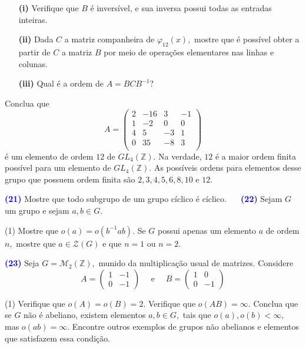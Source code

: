 \documentclass[12pt, a4paper]{article}
\newcommand{\negrito}[1]{\mbox{\boldmath{$#1$}}}
\begin{document}
\begin{tasks}[counter-format={(tsk[a])},label-width=3.6ex, label-format = {\bfseries}, column-sep = {0pt}]
\begin{itemize}
\item[\textbf{(i)}] Verifique que $B$ é inversível, e sua inversa possui todas as entradas inteiras.
\item[\textbf{(ii)}] Dada $C$ a matriz companheira de $\varphi_{12}(x),$ mostre que é possível obter a partir de $C$ a matriz $B$ por meio de operações elementares nas linhas e colunas.
\item[\textbf{(iii)}] Qual é a ordem de $A = BCB^{-1}?$
\end{itemize}
\task[\textcolor{Floresta}{$\negrito{(d)} $}] Conclua que 
\[
A =  \left(\begin{array}{cccc}
2 & -16 & 3 & -1\\
1 & -2 & 0 & 0\\
4 & 5 & -3 & 1\\
0 & 35 & -8 & 3\\
\end{array}\right)
\]
é um elemento de ordem $12$ de $GL_4(\mathbb{Z})$. Na verdade, $12$ é a maior ordem finita possível para um elemento de $GL_4(\mathbb{Z}).$ As possíveis ordens para elementos desse grupo que possuem ordem finita são $2,3,4,5,6,8,10$ e $12.$
\end{tasks}
\textcolor{blue}{\bf(21)}\label{28} Mostre que todo subgrupo de um grupo cíclico é cíclico.
\textcolor{white}{Oi}\newline\newline
\textcolor{blue}{\bf(22)}\label{29} Sejam $G$ um grupo e sejam $a,b \in G.$
\begin{tasks}[counter-format={(tsk[a])},label-width=3.6ex, label-format = {\bfseries}, column-sep = {0pt}](1)
\task[\textcolor{Floresta}{$\negrito{(a)} $}] Mostre que $o(a) = o(b^{-1}ab).$
\task[\textcolor{Floresta}{$\negrito{(b)} $}] Se $G$ possui apenas um elemento $a$ de ordem $n,$ mostre que $a \in \mathcal{Z}(G)$ e que $n = 1$ ou $n = 2.$ 
\end{tasks}
\textcolor{blue}{\bf(23)}\label{30} Seja $G = \mathcal{M}_2(\mathbb{Z}),$ munido da multiplicação usual de matrizes. Considere
\[
A = \left( \begin{array}{cc} 1 & -1 \\ 0 & -1 \end{array} \right) \quad \mbox{ e } \quad B = \left( \begin{array}{cc} 1 & 0 \\ 0 & -1 \end{array} \right) 
\]
\begin{tasks}[counter-format={(tsk[a])},label-width=3.6ex, label-format = {\bfseries}, column-sep = {0pt}](1)
\task[\textcolor{Floresta}{$\negrito{(a)} $}] Verifique que $o(A) = o(B) = 2.$
\task[\textcolor{Floresta}{$\negrito{(b)} $}] Verifique que $o(AB) = \infty.$
\task[\textcolor{Floresta}{$\negrito{(c)} $}] Conclua que se $G$ não é abeliano, existem elementos $a, b \in G,$ tais que $o(a), o(b) < \infty,$ mas $o(ab) = \infty.$
\task[\textcolor{Floresta}{$\negrito{(d)} $}] Encontre outros exemplos de grupos não abelianos e elementos que satisfazem essa condição.
\end{tasks}
\end{document}
